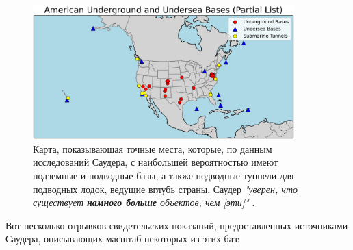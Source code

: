 \documentclass[10pt,twocolumn,letterpaper]{article}
\begin{document}
\begin{figure}[t]
\begin{center}
\includegraphics[width=0.9\textwidth]{basescrop.png}
\end{center}
   \caption{Карта, показывающая точные места, которые, по данным исследований Саудера, с наибольшей вероятностью имеют подземные и подводные базы, а также подводные туннели для подводных лодок, ведущие вглубь страны. Саудер \textit{"уверен, что существует \textbf{намного больше} объектов, чем [эти]"} \cite{22}.}
   \label{fig:4}
\end{figure}

Вот несколько отрывков свидетельских показаний, предоставленных источниками Саудера, описывающих масштаб некоторых из этих баз:
\end{document}

